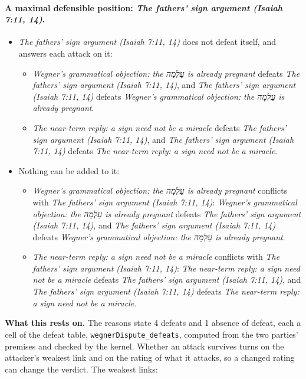 \documentclass[11pt]{article}
\begin{document}
\paragraph{A maximal defensible position: \emph{The fathers' sign argument (Isaiah 7:11, 14)}.}
\begin{itemize}
\item \emph{The fathers' sign argument (Isaiah 7:11, 14)} does not defeat itself, and answers each attack on it:
\begin{itemize}
\item \emph{Wegner's grammatical objection: the עַלְמָה is already pregnant} defeats \emph{The fathers' sign argument (Isaiah 7:11, 14)}, and \emph{The fathers' sign argument (Isaiah 7:11, 14)} defeats \emph{Wegner's grammatical objection: the עַלְמָה is already pregnant}.
\item \emph{The near-term reply: a sign need not be a miracle} defeats \emph{The fathers' sign argument (Isaiah 7:11, 14)}, and \emph{The fathers' sign argument (Isaiah 7:11, 14)} defeats \emph{The near-term reply: a sign need not be a miracle}.
\end{itemize}
\item Nothing can be added to it:
\begin{itemize}
\item \emph{Wegner's grammatical objection: the עַלְמָה is already pregnant} conflicts with \emph{The fathers' sign argument (Isaiah 7:11, 14)}: \emph{Wegner's grammatical objection: the עַלְמָה is already pregnant} defeats \emph{The fathers' sign argument (Isaiah 7:11, 14)}, and \emph{The fathers' sign argument (Isaiah 7:11, 14)} defeats \emph{Wegner's grammatical objection: the עַלְמָה is already pregnant}.
\item \emph{The near-term reply: a sign need not be a miracle} conflicts with \emph{The fathers' sign argument (Isaiah 7:11, 14)}: \emph{The near-term reply: a sign need not be a miracle} defeats \emph{The fathers' sign argument (Isaiah 7:11, 14)}, and \emph{The fathers' sign argument (Isaiah 7:11, 14)} defeats \emph{The near-term reply: a sign need not be a miracle}.
\end{itemize}
\end{itemize}
\par\noindent\textbf{What this rests on.} The reasons state 4 defeats and 1 absence of defeat, each a cell of the defeat table, \texttt{wegner\allowbreak{}Dispute\_\allowbreak{}defeats}, computed from the two parties' premises and checked by the kernel. Whether an attack survives turns on the attacker's weakest link and on the rating of what it attacks, so a changed rating can change the verdict. The weakest links:
\end{document}
